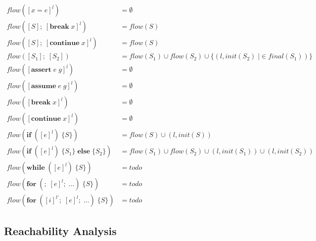 \begin{align*}
    flow([x = e]^l)                                             &= \emptyset  \\
    flow([S];\;[\textbf{break}\;x]^l)                           &= flow(S)    \\
    flow([S];\;[\textbf{continue}\;x]^l)                        &= flow(S)    \\
    flow([S_1];\;[S_2])                                         &= flow(S_1) \cup flow(S_2) \cup \{(l,init(S_2)\;| \in final(S_1))\}  \\
    flow([\textbf{assert}\;e\;g]^l)                             &= \emptyset          \\
    flow([\textbf{assume}\;e\;g]^l)                             &= \emptyset          \\
    flow([\textbf{break}\;x]^l)                                 &= \emptyset          \\
    flow([\textbf{continue}\;x]^l)                              &= \emptyset          \\
    flow(\textbf{if}\;([e]^l)\;\{S\})                           &= flow(S) \cup (l,init(S))  \\
    flow(\textbf{if}\;([e]^l)\;\{S_1\}\;\textbf{else}\;\{S_2\}) &= flow(S_1) \cup flow(S_2) \cup (l,init(S_1)) \cup (l,init(S_2)) \\
    flow(\textbf{while}\;([e]^l)\;\{S\})                        &= todo           \\
    flow(\textbf{for}\;(;\;[e]^l;\;\dots)\;\{S\})               &= todo           \\
    flow(\textbf{for}\;([i]^{l'};\;[e]^l;\;\dots)\;\{S\})       &= todo 
\end{align*}

\subsection{Reachability Analysis}